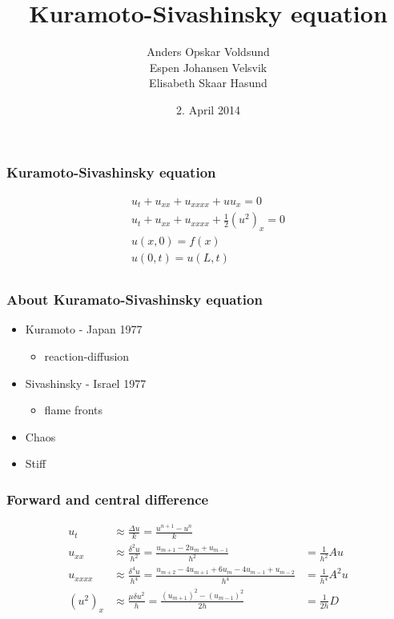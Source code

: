 \documentclass[screen]{beamer}
\title[Kuramoto-Sivashinsky]%
{Kuramoto-Sivashinsky equation}
\author[Author, Anders] %
{Anders Opskar Voldsund \\Espen Johansen Velsvik \\Elisabeth Skaar Hasund}
\date{2. April 2014}
\begin{document}
\begin{frame}
\titlepage

\end{frame}

\begin{frame}
\frametitle{Kuramoto-Sivashinsky equation}
\Large
\begin{align*}
u_t + u_{xx} + u_{xxxx} + uu_x = 0 \\
u_t + u_{xx} + u_{xxxx} + \frac{1}{2}(u^2)_x = 0 \\
u(x,0) = f(x) \\
u(0,t) = u(L,t) \\
\end{align*}
\end{frame}


\begin{frame}
\frametitle{About Kuramato-Sivashinsky equation}
\begin{itemize}
\item Kuramoto - Japan 1977
\begin{itemize}
\item reaction-diffusion
\end{itemize}

\item Sivashinsky - Israel 1977
\begin{itemize}
\item flame fronts
\end{itemize}
\item Chaos
\item Stiff

\end{itemize}

\end{frame}


\begin{frame}
\frametitle{Forward and central difference}
\begin{align*}
u_t &\approx \frac{\Delta u}{k} = \frac{u^{n+1}-u^n}{k} \\
u_{xx} &\approx \frac{\delta^2 u}{h^2} = \frac{u_{m+1}-2u_{m}+u_{m-1}}{h^2} &= \frac{1}{h^2}Au \\
u_{xxxx} &\approx \frac{\delta^4 u}{h^4} = \frac{u_{m+2}-4u_{m+1}+6u_m-4u_{m-1}+u_{m-2}}{h^4} &= \frac{1}{h^4}A^2u\\
(u^2)_{x} &\approx \frac{\mu \delta u^2}{h} = \frac{(u_{m+1})^2-(u_{m-1})^2}{2h} &= \frac{1}{2h}D\\
\end{align*}
\end{frame}
\end{document}
